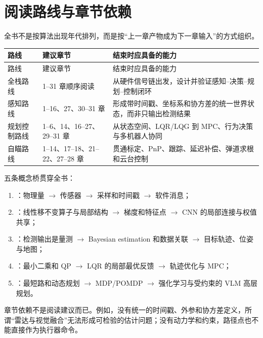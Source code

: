\chapter*{阅读路线与章节依赖}

全书不是按算法出现年代排列，而是按“上一章产物成为下一章输入”的方式组织。

\begin{longtable}{p{}p{}p{}}
\toprule
路线 & 建议章节 & 结束时应具备的能力 \\
\midrule
\endfirsthead
\toprule
路线 & 建议章节 & 结束时应具备的能力 \\
\midrule
\endhead
全栈路线 & 1--31 章顺序阅读 & 从硬件信号链出发，设计并验证感知--决策--规划--控制闭环 \\
感知路线 & 1--16、27、30--31 章 & 形成带时间戳、坐标系和协方差的统一世界状态，而非只输出检测结果 \\
规划控制路线 & 1--6、14、16--27、29--31 章 & 从状态空间、LQR/LQG 到 MPC、行为决策与多机器人协同 \\
自瞄路线 & 1--14、17--18、21--22、27--28 章 & 贯通标定、PnP、跟踪、延迟补偿、弹道求根和云台控制 \\
\bottomrule
\end{longtable}

五条概念桥贯穿全书：

\begin{enumerate}
  \item {}：物理量 $\rightarrow$ 传感器 $\rightarrow$ 采样和时间戳 $\rightarrow$ 软件消息；
  \item {}：线性移不变算子与局部结构 $\rightarrow$ 梯度和特征点 $\rightarrow$ CNN 的局部连接与权值共享；
  \item {}：检测输出是量测 $\rightarrow$ Bayesian estimation 和数据关联 $\rightarrow$ 目标轨迹、位姿与地图；
  \item {}：最小二乘和 QP $\rightarrow$ LQR 的局部最优反馈 $\rightarrow$ 轨迹优化与 MPC；
  \item {}：最短路和动态规划 $\rightarrow$ MDP/POMDP $\rightarrow$ 强化学习与受约束的 VLM 高层规划。
\end{enumerate}

\begin{failuremode}
章节依赖不是阅读建议而已。例如，没有统一的时间戳、外参和协方差定义，所谓“雷达与视觉融合”无法形成可检验的估计问题；没有动力学和约束，路径点也不能直接作为执行器命令。
\end{failuremode}

